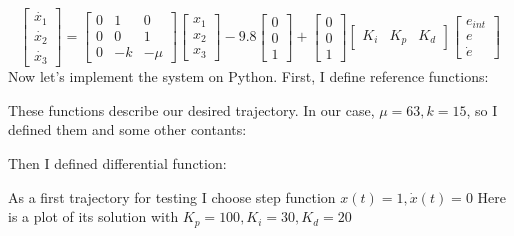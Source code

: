 \documentclass[a4paper,12pt]{article}
\begin{document}
    \begin{equation*}
        \begin{bmatrix}
            \dot{x_1}\\
            \dot{x_2}\\
            \dot{x_3}
        \end{bmatrix}
        =
        \begin{bmatrix}
            0 & 1 & 0\\
            0 & 0 & 1\\
            0 & -k & -\mu
        \end{bmatrix}
        \begin{bmatrix}
            x_1\\
            x_2\\
            x_3
        \end{bmatrix}
        - 9.8
        \begin{bmatrix}
            0\\
            0\\
            1
        \end{bmatrix}
        +
        \begin{bmatrix}
            0\\
            0\\
            1
        \end{bmatrix}
        \begin{bmatrix}
            K_i & K_p & K_d
        \end{bmatrix}
        \begin{bmatrix}
            e_{int}\\
            e\\
            \dot{e}
        \end{bmatrix}
    \end{equation*}
    Now let's implement the system on Python. First, I define reference functions:
    
    These functions describe our desired trajectory. 
    In our case, $\mu = 63, k = 15$, so I defined them and some other contants:
    
    Then I defined differential function:
    
    As a first trajectory for testing I choose step function $x(t)=1, \dot x(t)=0$
    Here is a plot of its solution with $K_p = 100, K_i = 30, K_d = 20$
\end{document}
